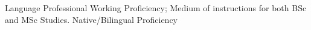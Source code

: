 
\begin{rubric}{Language}
    \entry*[English]
        Professional Working Proficiency; Medium of instructions for both BSc and MSc Studies.
    \entry*[Bengali]
        Native/Bilingual Proficiency
\end{rubric}
    
